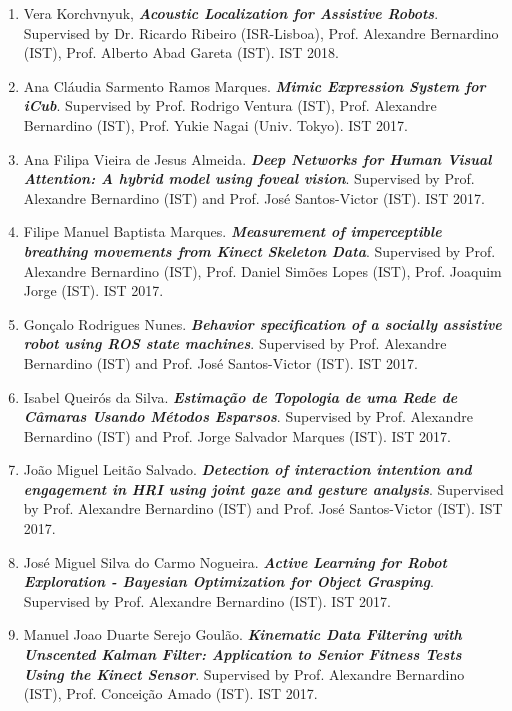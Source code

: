 \documentclass[
]{article}
\begin{document}
\begin{enumerate}
  Rui Miguel Garcia Figueiredo. \emph{\textbf{Deep
  Recognition-by-tracking in a Robot Environment}}. Supervised by Prof.
  Alexandre Bernardino (IST) and Prof. José Santos-Victor (IST). IST
  2018.
\item
  Vera Korchvnyuk, \emph{\textbf{Acoustic Localization for Assistive
  Robots}}. Supervised by Dr. Ricardo Ribeiro (ISR-Lisboa), Prof.
  Alexandre Bernardino (IST), Prof. Alberto Abad Gareta (IST). IST 2018.
\item
  Ana Cláudia Sarmento Ramos Marques. \emph{\textbf{Mimic Expression
  System for iCub}}. Supervised by Prof. Rodrigo Ventura (IST), Prof.
  Alexandre Bernardino (IST), Prof. Yukie Nagai (Univ. Tokyo). IST 2017.
\item
  Ana Filipa Vieira de Jesus Almeida. \emph{\textbf{Deep Networks for
  Human Visual Attention: A hybrid model using foveal vision}}.
  Supervised by Prof. Alexandre Bernardino (IST) and Prof. José
  Santos-Victor (IST). IST 2017.
\item
  Filipe Manuel Baptista Marques. \emph{\textbf{Measurement of
  imperceptible breathing movements from Kinect Skeleton Data}}.
  Supervised by Prof. Alexandre Bernardino (IST), Prof. Daniel Simões
  Lopes (IST), Prof. Joaquim Jorge (IST). IST 2017.
\item
  Gonçalo Rodrigues Nunes. \emph{\textbf{Behavior specification of a
  socially assistive robot using ROS state machines}}. Supervised by
  Prof. Alexandre Bernardino (IST) and Prof. José Santos-Victor (IST).
  IST 2017.
\item
  Isabel Queirós da Silva. \emph{\textbf{Estimação de Topologia de uma
  Rede de Câmaras Usando Métodos Esparsos}}. Supervised by Prof.
  Alexandre Bernardino (IST) and Prof. Jorge Salvador Marques (IST). IST
  2017.
\item
  João Miguel Leitão Salvado. \emph{\textbf{Detection of interaction
  intention and engagement in HRI using joint gaze and gesture
  analysis}}. Supervised by Prof. Alexandre Bernardino (IST) and Prof.
  José Santos-Victor (IST). IST 2017.
\item
  José Miguel Silva do Carmo Nogueira. \emph{\textbf{Active Learning for
  Robot Exploration - Bayesian Optimization for Object Grasping}}.
  Supervised by Prof. Alexandre Bernardino (IST). IST 2017.
\item
  Manuel Joao Duarte Serejo Goulão. \emph{\textbf{Kinematic Data
  Filtering with Unscented Kalman Filter: Application to Senior Fitness
  Tests Using the Kinect Sensor}}. Supervised by Prof. Alexandre
  Bernardino (IST), Prof. Conceição Amado (IST). IST 2017.

\end{enumerate}
\end{document}
